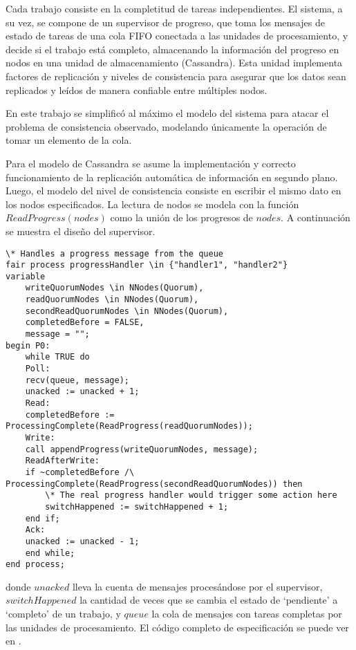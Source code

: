 \documentclass[runningheads]{llncs}
\begin{document}
Cada trabajo consiste en la completitud de tareas independientes. El sistema, a su vez, se compone de un supervisor de progreso, que toma los mensajes de estado de tareas de una cola FIFO conectada a las unidades de procesamiento, y decide si el trabajo está completo, almacenando la información del progreso en nodos en una unidad de almacenamiento (Cassandra). Esta unidad implementa factores de replicación y niveles de consistencia para asegurar que los datos sean replicados y leídos de manera confiable entre múltiples nodos.

En este trabajo se simplificó al máximo el modelo del sistema para atacar el problema de consistencia observado, modelando únicamente la operación de tomar un elemento de la cola.

Para el modelo de Cassandra se asume la implementación y correcto funcionamiento de la replicación automática de información en segundo plano. Luego, el modelo del nivel de consistencia consiste en escribir el mismo dato en los nodos especificados. La lectura de nodos se modela con la función $ReadProgress(nodes)$ como la unión de los progresos de $nodes$. A continuación se muestra el diseño del supervisor.

\begin{lstlisting}
\* Handles a progress message from the queue
fair process progressHandler \in {"handler1", "handler2"}
variable
    writeQuorumNodes \in NNodes(Quorum),
    readQuorumNodes \in NNodes(Quorum),
    secondReadQuorumNodes \in NNodes(Quorum),
    completedBefore = FALSE,
    message = "";
begin P0:
    while TRUE do
    Poll:
    recv(queue, message);
    unacked := unacked + 1;
    Read:
    completedBefore := ProcessingComplete(ReadProgress(readQuorumNodes));
    Write:
    call appendProgress(writeQuorumNodes, message);
    ReadAfterWrite:
    if ~completedBefore /\ ProcessingComplete(ReadProgress(secondReadQuorumNodes)) then
        \* The real progress handler would trigger some action here
        switchHappened := switchHappened + 1;
    end if;
    Ack:
    unacked := unacked - 1;
    end while;
end process;    
\end{lstlisting}

donde $unacked$ lleva la cuenta de mensajes procesándose por el supervisor, $switchHappened$ la cantidad de veces que se cambia el estado de ‘pendiente’ a ‘completo’ de un trabajo, y $queue$ la cola de mensajes con tareas completas por las unidades de procesamiento. El código completo de especificación se puede ver en 
\cite{caso_de_estudio}.
\end{document}
